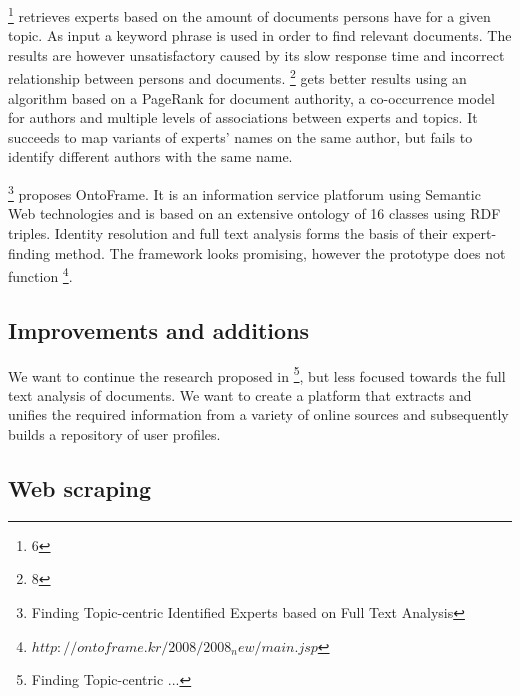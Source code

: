 \footnote{6} retrieves experts based on the amount of documents persons have for a given topic. As input a keyword phrase is used in order to find relevant documents. The results are however unsatisfactory caused by its slow response time and incorrect relationship between persons and documents. \footnote{8} gets better results using an algorithm based on a PageRank for document authority, a co-occurrence model for authors and multiple levels of associations between experts and topics. It succeeds to map variants of experts' names on the same author, but fails to identify different authors with the same name.

\footnote{Finding Topic-centric Identified Experts based on Full Text Analysis} proposes OntoFrame. It is an information service platforum using Semantic Web technologies and is based on an extensive ontology of 16 classes using RDF triples. Identity resolution and full text analysis forms the basis of their expert-finding method. The framework looks promising, however the prototype does not function \footnote{$http://ontoframe.kr/2008/2008_new/main.jsp$}.

\subsection{Improvements and additions}


We want to continue the research proposed in \footnote{Finding Topic-centric ...}, but less focused towards the full text analysis of documents. We want to create a platform that extracts and unifies the required information from a variety of online sources and subsequently builds a repository of user profiles.





\subsection{Web scraping}

